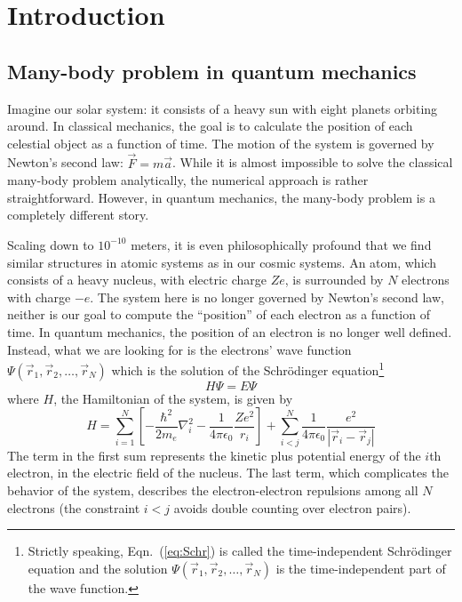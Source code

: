 \chapter{Introduction}

\section{Many-body problem in quantum mechanics}
Imagine our solar system: it consists of a heavy sun with eight planets
orbiting around. In classical mechanics, the goal is to calculate the
position of each celestial object as a function of time. The motion of
the system is governed by Newton's second law: $\vec{F}=m\vec{a}$. While it is almost
impossible to solve the classical many-body problem analytically, the numerical
approach is rather straightforward. However, in quantum mechanics,
the many-body problem is a completely different story.

Scaling down to $10^{-10}$ meters, it is even philosophically profound that we
find similar structures in atomic systems as in our cosmic systems. An atom,
which consists of a heavy nucleus, with electric charge $Ze$, is surrounded by
$N$ electrons with charge $-e$. The system here is no longer governed by
Newton's second law, neither is our goal to compute the ``position'' of each
electron as a function of time. In quantum mechanics, the position of an
electron is no longer well defined. Instead, what we are looking for is the
electrons' wave function $\Psi(\vec{r}_1,\vec{r}_2,\ldots,\vec{r}_N)$ which
is the solution of the Schr\"{o}dinger equation\footnote{Strictly speaking,
Eqn.~(\ref{eq:Schr}) is called the time-independent Schr\"{o}dinger equation
and the solution $\Psi(\vec{r}_1,\vec{r}_2,\ldots,\vec{r}_N)$ is the
time-independent part of the wave function.}
\begin{equation} \label{eq:Schr}
H \Psi = E \Psi
\end{equation}
where $H$, the Hamiltonian of the system, is given by
\begin{equation} \label{eq:Hamit}
H = \sum_{i=1}^N \left[ -\frac{\hbar^2}{2m_e} \nabla_i^2 - \frac{1}{4\pi\epsilon_0} \frac{Ze^2}{r_i} \right] + \sum_{i<j}^N \frac{1}{4\pi\epsilon_0} \frac{e^2}{|\vec{r}_i - \vec{r}_j|}
\end{equation}
The term in the first sum represents the kinetic plus potential energy of the
$i$th electron, in the electric field of the nucleus. The last term, which
complicates the behavior of the system, describes the electron-electron
repulsions among all $N$ electrons (the constraint $i<j$ avoids double counting
over electron pairs).

